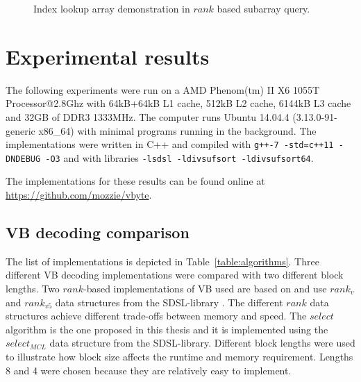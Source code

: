 \begin{figure}[ht]
\caption{Index lookup array demonstration in $rank$ based subarray query.}\label{bris_subarray}

\end{figure}

\chapter{Experimental results}

The following experiments were run on a AMD Phenom(tm) II X6 1055T Processor@2.8Ghz with 64kB+64kB L1 cache, 512kB L2 cache, 6144kB L3 cache and 32GB of DDR3 1333MHz.
The computer runs Ubuntu 14.04.4 (3.13.0-91-generic x86\_64) with minimal programs running in the background. The implementations were written in C++ and compiled with 
\texttt{g++-7 -std=c++11 -DNDEBUG -O3} 
and with libraries \texttt{-lsdsl -ldivsufsort -ldivsufsort64}.

The implementations for these results can be found online at \href{https://github.com/mozzie/vbyte}{https://github.com/mozzie/vbyte}.

\section{VB decoding comparison}
The list of implementations is depicted in Table~\ref{table:algorithms}. Three different VB decoding implementations were compared with two different block lengths. Two $rank$-based implementations 
of VB used are based on \citep{Bri09} and use $rank_v$ and $rank_{v5}$ data structures 
from the SDSL-library \citep{gbmp2014sea}. The different $rank$ data structures achieve different trade-offs between memory and speed. The $select$ algorithm is the one proposed in this thesis and it is 
implemented using the $select_{MCL}$ data structure from the SDSL-library. Different block lengths were used to illustrate how block size affects the runtime and memory requirement. Lengths 
8 and 4 were chosen because they are relatively easy to implement. 

